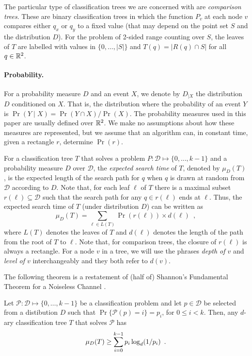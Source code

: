\documentclass[lotsofwhite,charterfonts]{patmorin}
\newcommand{\depth}{d}
\begin{document}
The particular type of classification trees we are concerned with are
\emph{comparison trees}.  These are binary classification trees in
which the function $P_v$ at each node $v$ compares either $q_x$ or
$q_y$ to a fixed value (that may depend on the point set $S$ and the
distribution $D$).  For the problem of 2-sided range counting over
$S$, the leaves of $T$ are labelled with values in $\{0,\ldots,|S|\}$
and $T(q)=|R(q)\cap S|$ for all $q\in\mathbb{R}^2$.


\paragraph{Probability.}

For a probability measure $D$ and an event $X$, we denote by $D_{|X}$ the
distribution $D$ conditioned on $X$.  That is, the distribution where
the probability of an event $Y$ is $\Pr(Y\mid X)=\Pr(Y\cap X)/\Pr(X)$.
The probability measures used in this paper are usually defined over
$\mathbb{R}^2$.  We make no assumptions about how these measures are
represented, but we assume that an algorithm can, in constant time,
given a rectangle $r$, determine $\Pr(r)$.

For a classification tree $T$ that solves a problem
$P:\mathcal{D}\mapsto\{0,\ldots,k-1\}$ and a probability measure $D$
over $\mathcal{D}$, the \emph{expected search time} of $T$, denoted
by $\mu_D(T)$, is the
expected length of the search path for $q$ when $q$ is drawn at random
from $\mathcal{D}$ according to $D$.  Note that, for each leaf $\ell$
of $T$ there is a maximal subset $r(\ell)\subseteq \mathcal{D}$ such
that the search path for any $q\in r(\ell)$ ends at $\ell$.  Thus, the
expected search time of $T$ (under distribution $D$) can be written as
\[
     \mu_D(T) = \sum_{\ell\in L(T)} \Pr(r(\ell))\times \depth(\ell)
	\enspace ,
\]
where $L(T)$ denotes the leaves of $T$ and $\depth(\ell)$ denotes the
length of the path from the root of $T$ to $\ell$. Note that, for
comparison trees, the closure of $r(\ell)$ is always a rectangle.  For
a node $v$ in a tree, we will use the phrases \emph{depth of $v$} and
\emph{level of $v$} interchangeably and they both refer to $d(v)$. 

The following theorem is a restatement of (half of) Shannon's
Fundamental Theorem for a Noiseless Channel \cite[Theorem 9]{s48}.
\begin{thm}
Let $\mathcal{P}:\mathcal{D}\mapsto \{0,\ldots,k-1\}$ be a classification
problem and let $p\in \mathcal{D}$ be selected from a distibution $D$ such
that $\Pr\{\mathcal{P}(p)= i\}=p_i$, for $0\le i< k$.  Then, any
$d$-ary classification tree $T$ that solves $\mathcal{P}$ has
\begin{equation}
     \mu_D(T) \ge \sum_{i=0}^{k-1} p_i\log_d(1/p_i) \enspace .
	\eqlabel{shannon}
\end{equation}
\end{thm}
\end{document}
